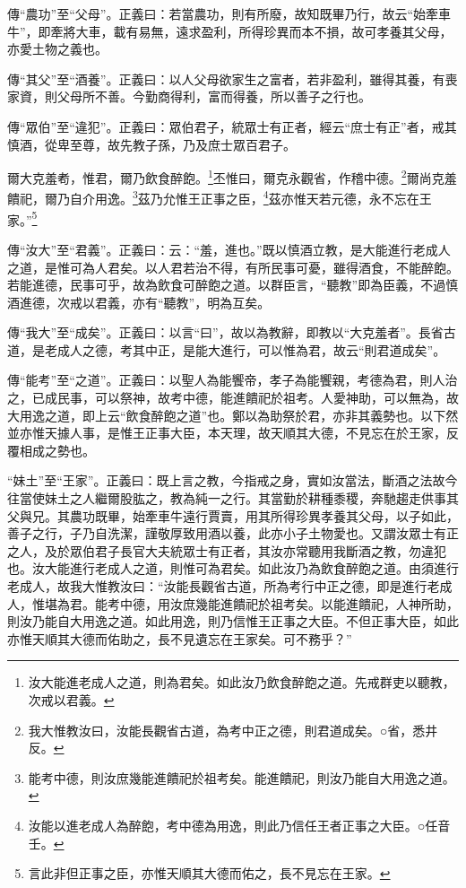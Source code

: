 {\noindent\zhuan{}\fzbyks 傳“農功”至“父母”。正義曰：若當農功，則有所廢，故知既畢乃行，故云“始牽車牛”，即牽將大車，載有易無，遠求盈利，所得珍異而本不損，故可孝養其父母，亦愛土物之義也。 \par}

{\noindent\zhuan{}\fzbyks 傳“其父”至“酒養”。正義曰：以人父母欲家生之富者，若非盈利，雖得其養，有喪家資，則父母所不善。今勤商得利，富而得養，所以善子之行也。 \par}

{\noindent\zhuan{}\fzbyks 傳“眾伯”至“違犯”。正義曰：眾伯君子，統眾士有正者，經云“庶士有正”者，戒其慎酒，從卑至尊，故先教子孫，乃及庶士眾百君子。 \par}

爾大克羞耇，惟君，爾乃飲食醉飽。\footnote{汝大能進老成人之道，則為君矣。如此汝乃飲食醉飽之道。先戒群吏以聽教，次戒以君義。}丕惟曰，爾克永觀省，作稽中德。\footnote{我大惟教汝曰，汝能長觀省古道，為考中正之德，則君道成矣。○省，悉井反。}爾尚克羞饋祀，爾乃自介用逸。\footnote{能考中德，則汝庶幾能進饋祀於祖考矣。能進饋祀，則汝乃能自大用逸之道。}茲乃允惟王正事之臣，\footnote{汝能以進老成人為醉飽，考中德為用逸，則此乃信任王者正事之大臣。○任音壬。}茲亦惟天若元德，永不忘在王家。”\footnote{言此非但正事之臣，亦惟天順其大德而佑之，長不見忘在王家。}

{\noindent\zhuan{}\fzbyks 傳“汝大”至“君義”。正義曰：云：“羞，進也。”既以慎酒立教，是大能進行老成人之道，是惟可為人君矣。以人君若治不得，有所民事可憂，雖得酒食，不能醉飽。若能進德，民事可乎，故為飲食可醉飽之道。以群臣言，“聽教”即為臣義，不過慎酒進德，次戒以君義，亦有“聽教”，明為互矣。 \par}

{\noindent\zhuan{}\fzbyks 傳“我大”至“成矣”。正義曰：以言“曰”，故以為教辭，即教以“大克羞者”。長省古道，是老成人之德，考其中正，是能大進行，可以惟為君，故云“則君道成矣”。 \par}

{\noindent\zhuan{}\fzbyks 傳“能考”至“之道”。正義曰：以聖人為能饗帝，孝子為能饗親，考德為君，則人治之，已成民事，可以祭神，故考中德，能進饋祀於祖考。人愛神助，可以無為，故大用逸之道，即上云“飲食醉飽之道”也。鄭以為助祭於君，亦非其義勢也。以下然並亦惟天據人事，是惟王正事大臣，本天理，故天順其大德，不見忘在於王家，反覆相成之勢也。 \par}

{\noindent\shu{}\fzkt “妹土”至“王家”。正義曰：既上言之教，今指戒之身，實如汝當法，斷酒之法故今往當使妹土之人繼爾股肱之，教為純一之行。其當勤於耕種黍稷，奔馳趨走供事其父與兄。其農功既畢，始牽車牛遠行賈賣，用其所得珍異孝養其父母，以子如此，善子之行，子乃自洗潔，謹敬厚致用酒以養，此亦小子土物愛也。又謂汝眾士有正之人，及於眾伯君子長官大夫統眾士有正者，其汝亦常聽用我斷酒之教，勿違犯也。汝大能進行老成人之道，則惟可為君矣。如此汝乃為飲食醉飽之道。由須進行老成人，故我大惟教汝曰：“汝能長觀省古道，所為考行中正之德，即是進行老成人，惟堪為君。能考中德，用汝庶幾能進饋祀於祖考矣。以能進饋祀，人神所助，則汝乃能自大用逸之道。如此用逸，則乃信惟王正事之大臣。不但正事大臣，如此亦惟天順其大德而佑助之，長不見遺忘在王家矣。可不務乎？” \par}


